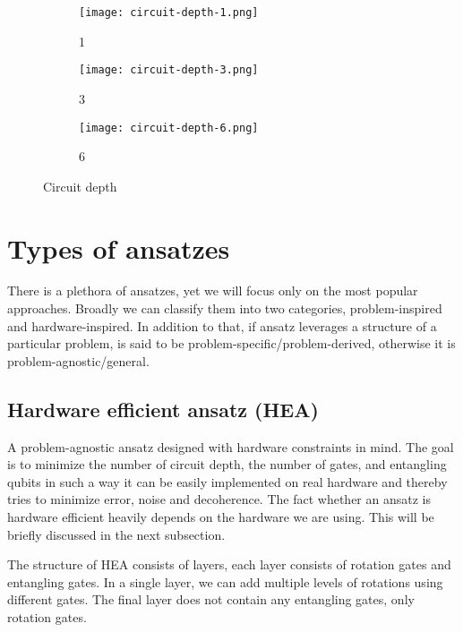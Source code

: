 \begin{figure}[H]
    \centering
    \begin{subfigure}[b]{0.2\textwidth}
        \centering
        \texttt{[image: circuit-depth-1.png]} 
        \caption*{1}
    \end{subfigure}
    \hfill
    \begin{subfigure}[b]{0.3\textwidth}
        \centering
        \texttt{[image: circuit-depth-3.png]}
        \caption*{3}
    \end{subfigure}
    \hfill
    \begin{subfigure}[b]{0.45\textwidth}
        \centering
        \texttt{[image: circuit-depth-6.png]}
        \caption*{6}
    \end{subfigure}
       \caption{Circuit depth}
       \label{fig:circuit-depth}
\end{figure}

\section{Types of ansatzes}
There is a plethora of ansatzes, yet we will focus only on the most popular approaches. Broadly we can classify them into two categories, problem-inspired and hardware-inspired. In addition to that, if ansatz leverages a structure of a particular problem, is said to be problem-specific/problem-derived, otherwise it is problem-agnostic/general. 

\subsection{Hardware efficient ansatz (HEA)}
A problem-agnostic ansatz designed with hardware constraints in mind. The goal is to minimize the number of circuit depth, the number of gates, and entangling qubits in such a way it can be easily implemented on real hardware and thereby tries to minimize error, noise and decoherence. The fact whether an ansatz is hardware efficient heavily depends on the hardware we are using. This will be briefly discussed in the next subsection.

The structure of HEA consists of layers, each layer consists of rotation gates and entangling gates. In a single layer, we can add multiple levels of rotations using different gates. The final layer does not contain any entangling gates, only rotation gates. 

